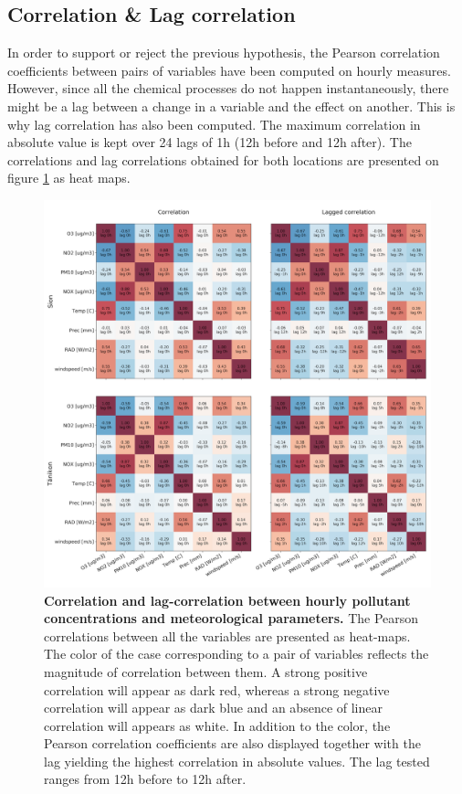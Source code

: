 \documentclass[a4paper, 12pt]{article}
\begin{document}
    \subsection{Correlation \& Lag correlation}
        In order to support or reject the previous hypothesis, the Pearson correlation coefficients between pairs of variables have been computed on hourly measures. However, since all the chemical processes do not happen instantaneously, there might be a lag between a change in a variable and the effect on another. This is why lag correlation has also been computed. The maximum correlation in absolute value is kept over 24 lags of 1h (12h before and 12h after). The correlations and lag correlations obtained for both locations are presented on figure \ref{fig:correlation_maps} as heat maps. 
        \\
        \begin{figure}[t!]
            \centering
            \includegraphics[width = 1 \textwidth]{Figures/yearly_correlations.png}
            \caption{\textbf{Correlation and lag-correlation between hourly pollutant concentrations and meteorological parameters.} The Pearson correlations between all the variables are presented as heat-maps. The color of the case corresponding to a pair of variables reflects the magnitude of correlation between them. A strong positive correlation will appear as dark red, whereas a strong negative correlation will appear as dark blue and an absence of linear correlation will appears as white. In addition to the color, the Pearson correlation coefficients are also displayed together with the lag yielding the highest correlation in absolute values. The lag tested ranges from 12h before to 12h after.}
            \label{fig:correlation_maps}
        \end{figure}
\end{document}
